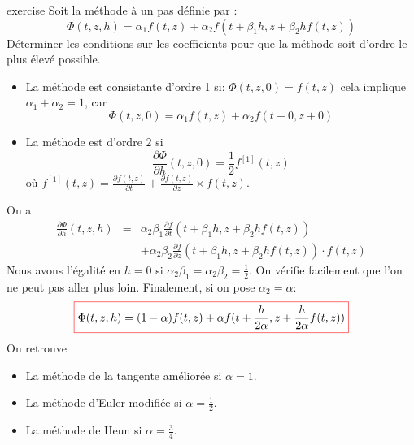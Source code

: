 \documentclass{beamer}
\newcommand{\myredbox}[1]{\fcolorbox{red}{white}{$\displaystyle#1$}}
\begin{document}
\begin{frame}

\begin{block}{exercise}
Soit la méthode à un pas définie par :
\[\Phi(t,z,h)=\alpha_1 f(t,z)+\alpha_2f(t+\beta_1 h,z+\beta_2 h f(t,z))\]
Déterminer les conditions sur les coefficients pour que la méthode soit d'ordre le plus élevé possible.
\end{block}
\begin{itemize}
\item La méthode est consistante d'ordre 1 si: $\Phi(t,z,0)=f(t,z)$ cela implique $\alpha_1+\alpha_2=1$, car
\[\Phi(t,z,0)=\alpha_1 f(t,z)+\alpha_2f(t+0,z+0)\]
\item La méthode est d'ordre $2$ si
\[\frac{\partial \Phi}{\partial h}(t,z,0)=\frac 12 f^{[1]}(t,z)\]
où $f^{[1]}(t,z)=\frac{\partial f(t,z)}{\partial t}+\frac{\partial f(t,z)}{\partial z}\times f(t,z)$. 
\end{itemize}
\end{frame}
   

\begin{frame}
On a 
\[\begin{array}{lll}
 \frac{\partial \Phi}{\partial h}(t,z,h)&=&\alpha_2\beta_1\frac{\partial f} {\partial t}(t+\beta_1 h,z+\beta_2hf(t,z))\\
 & & +\alpha_2\beta_2\frac{\partial f} {\partial z}(t+\beta_1 h,z+\beta_2hf(t,z))\cdot f(t,z)
\end{array} 
\] Nous avons l'égalité en $h=0$ si $\alpha_2\beta_1=\alpha_2\beta_2=\frac 12$. On vérifie facilement que l'on ne peut pas aller plus loin.
Finalement, si on pose $\alpha_2=\alpha$:
\[\myredbox{\Phi(t,z,h)=(1-\alpha) f(t,z)+\alpha f(t+\frac h{2\alpha},z+\frac h{2\alpha} f(t,z))}\]
On retrouve
\begin{itemize}
\item La méthode de la tangente améliorée si $\alpha=1$.
\item La méthode d'Euler modifiée si $\alpha=\frac 12$.
\item La méthode de Heun si $\alpha=\frac 34$.
\end{itemize}



\end{frame}   
   
\end{document}
